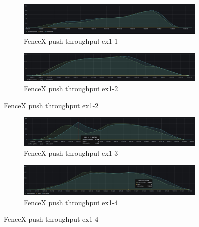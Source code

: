 \documentclass[a4]{report}
\begin{document}
    \begin{figure}
        \centering
        \begin{subfigure}[b]{\textwidth}
            \centering
            \label{fig:ex1-1}
            \caption{FenceX push throughput ex1-1}
            \includegraphics[width=\textwidth, height=0.3\textheight, scale=2]{images/evaluation/ex1-benchmarking(15,6).png}
        \end{subfigure}

        \begin{subfigure}[b]{\textwidth}
            \centering
            \caption{FenceX push throughput ex1-2}
            \label{fig:ex1-2}
            \includegraphics[width=\textwidth, height=0.3\textheight, scale=2]{images/evaluation/ex1-benchmarking(19,7).png}
        \end{subfigure}
    \end{figure}

    \begin{figure}
        \centering
        \begin{subfigure}[b]{\textwidth}
            \centering
            \caption{FenceX push throughput ex1-3}
            \label{fig:ex1-3}
            \includegraphics[width=\textwidth, height=0.3\textheight, scale=2]{images/evaluation/ex1-benchmarking(22,9).png}
        \end{subfigure}

        \begin{subfigure}[b]{\textwidth}
            \centering
            \caption{FenceX push throughput ex1-4}
            \label{fig:ex1-4}
            \includegraphics[width=\textwidth, height=0.3\textheight, scale=2]{images/evaluation/ex1-benchmarking(23,10).png}
        \end{subfigure}
    \end{figure}
\end{document}
